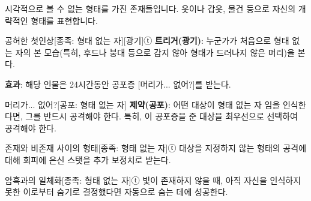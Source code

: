 \documentclass{report}
\begin{document}
	시각적으로 볼 수 없는 형태를 가진 존재들입니다. 옷이나 갑옷, 물건 등으로 자신의 개략적인 형태를 표현합니다.
	
	\begin{story}{공허한 첫인상}{[종족: 형태 없는 자][광기]ⓣ}
		\textbf{트리거(광기)}: 누군가가 처음으로 형태 없는 자의 본 모습(특히, 후드나 붕대 등으로 감지 않아 형태가 드러나지 않은 머리)을 본다.
		
		\textbf{효과}: 해당 인물은 24시간동안 공포증 [머리가... 없어?]를 받는다.
		
	\end{story}
	
	\begin{story}{머리가... 없어?}{[공포: 형태 없는 자]}
		\textbf{제약(공포)}: 어떤 대상이 형태 없는 자 임을 인식한다면, 그를 반드시 공격해야 한다. 특히, 이 공포증을 준 대상을 최우선으로 선택하여 공격해야 한다.
		
	\end{story}
	
	\begin{story}{존재와 비존재 사이의 형태}{[종족: 형태 없는 자]ⓣ}
		대상을 지정하지 않는 형태의 공격에 대해 회피에 은신 스탯을 추가 보정치로 받는다.
		
	\end{story}
	
	\begin{story}{암흑과의 일체화}{[종족: 형태 없는 자]ⓣ}
		빛이 존재하지 않을 때, 아직 자신을 인식하지 못한 이로부터 숨기로 결정했다면 자동으로 숨는 데에 성공한다.
		
	\end{story}
\end{document}
